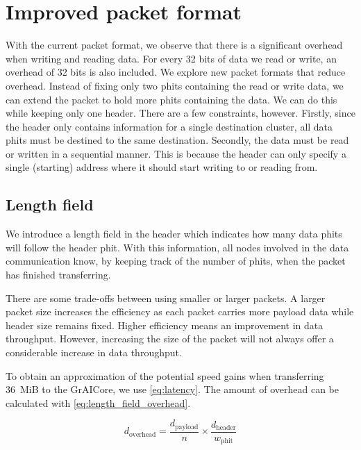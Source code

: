 \section{Improved packet format}
With the current packet format, we observe that there is a significant overhead when writing and reading data.
For every 32 bits of data we read or write, an overhead of 32 bits is also included.
We explore new packet formats that reduce overhead.
Instead of fixing only two phits containing the read or write data, we can extend the packet to hold more phits containing the data.
We can do this while keeping only one header.
There are a few constraints, however.
Firstly, since the header only contains information for a single destination cluster, all data phits must be destined to the same destination.
Secondly, the data must be read or written in a sequential manner.
This is because the header can only specify a single (starting) address where it should start writing to or reading from.

\subsection{Length field}
We introduce a length field in the header which indicates how many data phits will follow the header phit.
With this information, all nodes involved in the data communication know, by keeping track of the number of phits, when the packet has finished transferring. 

There are some trade-offs between using smaller or larger packets.
A larger packet size increases the efficiency as each packet carries more payload data while header size remains fixed.
Higher efficiency means an improvement in data throughput.
However, increasing the size of the packet will not always offer a considerable increase in data throughput.

To obtain an approximation of the potential speed gains when transferring \SI{36}{MiB} to the GrAICore, we use \cref{eq:latency}.
The amount of overhead can be calculated with \cref{eq:length_field_overhead}.

\begin{equation}
    d_{\text{overhead}} = \frac{d_{\text{payload}}}{n} \times \frac{d_{\text{header}}}{w_{\text{phit}}}
\label{eq:length_field_overhead}
\end{equation}


